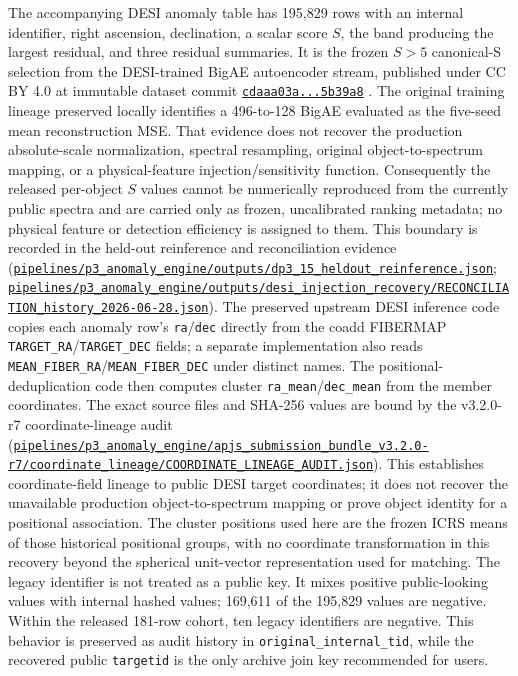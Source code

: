 \documentclass[twocolumn]{aastex701}
\newcommand{\repoBase}{https://github.com/Hubify-Projects/bigbounce/blob/main}
\newcommand{\artifact}[1]{\href{\repoBase/#1}{\nolinkurl{#1}}}
\newcommand{\bundleVersion}{v3.2.0-r7}
\begin{document}
The accompanying DESI anomaly table has 195,829 rows with an internal identifier, right
ascension, declination, a scalar score $S$, the band producing the largest residual, and three
residual summaries.  It is the frozen $S>5$ canonical-S selection from the DESI-trained BigAE
autoencoder stream, published under CC BY 4.0 at immutable dataset commit
\href{https://huggingface.co/datasets/bamfai/bigbounce-anomaly-catalog/tree/cdaaa03a72c69d86f011be128d93f261dc5b39a8}{\texttt{cdaaa03a...5b39a8}} \citep{Golden2026Data}.  The original
training lineage preserved locally identifies a 496-to-128 BigAE evaluated as the five-seed mean
reconstruction MSE.  That evidence does not recover the production absolute-scale normalization,
spectral resampling, original object-to-spectrum mapping, or a physical-feature injection/sensitivity
function.  Consequently the released per-object $S$ values cannot be numerically reproduced from
the currently public spectra and are carried only as frozen, uncalibrated ranking metadata; no
physical feature or detection efficiency is assigned to them.  This boundary is recorded in the
held-out reinference and reconciliation evidence
(\artifact{pipelines/p3\_anomaly\_engine/outputs/dp3\_15\_heldout\_reinference.json};
\artifact{pipelines/p3\_anomaly\_engine/outputs/desi\_injection\_recovery/RECONCILIATION\_history\_2026-06-28.json}).
The preserved upstream DESI inference code copies each anomaly row's \texttt{ra}/\texttt{dec}
directly from the coadd FIBERMAP \texttt{TARGET\_RA}/\texttt{TARGET\_DEC} fields; a separate
implementation also reads \texttt{MEAN\_FIBER\_RA}/\texttt{MEAN\_FIBER\_DEC} under distinct names.
The positional-deduplication code then computes cluster \texttt{ra\_mean}/\texttt{dec\_mean} from
the member coordinates.  The exact source files and SHA-256 values are bound by the \bundleVersion{}
coordinate-lineage audit
(\artifact{pipelines/p3\_anomaly\_engine/apjs\_submission\_bundle\_v3.2.0-r7/coordinate\_lineage/COORDINATE\_LINEAGE\_AUDIT.json}).
This establishes coordinate-field lineage to public DESI target coordinates; it does not recover
the unavailable production object-to-spectrum mapping or prove object identity for a positional
association.  The cluster positions used here are the frozen ICRS means of those historical
positional groups, with no coordinate transformation in this recovery beyond the spherical
unit-vector representation used for matching.  The legacy
identifier is not treated as a public key.  It mixes positive
public-looking values with internal hashed values; 169,611 of the 195,829 values are negative.
Within the released 181-row cohort, ten legacy identifiers are negative.  This behavior is
preserved as audit history in \texttt{original\_internal\_tid}, while the recovered public
\texttt{targetid} is the only archive join key recommended for users.
\end{document}
